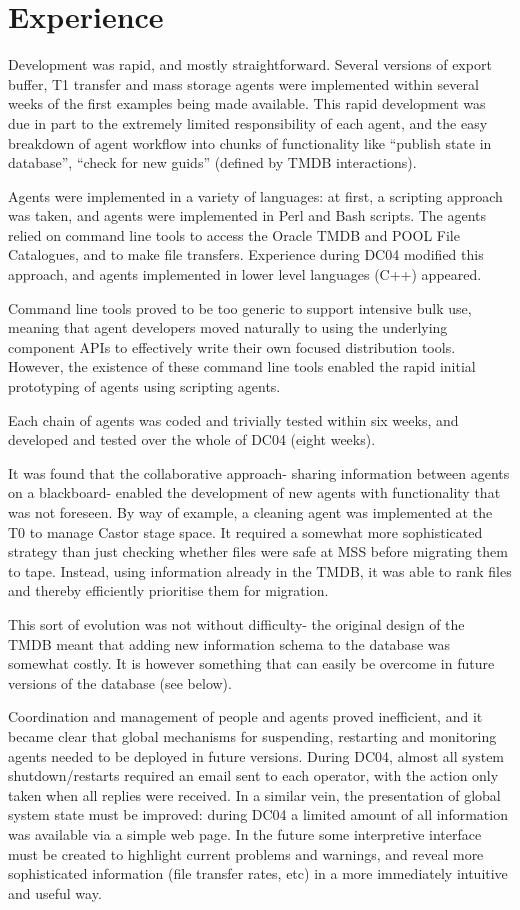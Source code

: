\documentclass{cmspaper}
\begin{document}
\section{Experience}
Development was rapid, and mostly straightforward. Several versions of
export buffer, T1 transfer and mass storage agents were implemented
within several weeks of the first examples being made available. This
rapid development was due in part to the extremely limited
responsibility of each agent, and the easy breakdown of agent workflow
into chunks of functionality like ``publish state in database'',
``check for new guids'' (defined by TMDB interactions).

Agents were implemented in a variety of languages: at first, a
scripting approach was taken, and agents were implemented in Perl and
Bash scripts. The agents relied on command line tools to access the
Oracle TMDB and POOL File Catalogues, and to make file
transfers. Experience during DC04 modified this approach, and agents
implemented in lower level languages (C++) appeared.

Command line tools proved to be too generic to support intensive bulk
use, meaning that agent developers moved naturally to using the
underlying component APIs to effectively write their own focused
distribution tools. However, the existence of these command line tools
enabled the rapid initial prototyping of agents using scripting
agents.

Each chain of agents was coded and trivially tested within six weeks,
and developed and tested over the whole of DC04 (eight weeks).

It was found that the collaborative approach- sharing information
between agents on a blackboard- enabled the development of new agents
with functionality that was not foreseen. By way of example, a
cleaning agent was implemented at the T0 to manage Castor stage
space. It required a somewhat more sophisticated strategy than just
checking whether files were safe at MSS before migrating them to
tape. Instead, using information already in the TMDB, it was able to
rank files and thereby efficiently prioritise them for migration.

This sort of evolution was not without difficulty- the original design
of the TMDB meant that adding new information schema to the database
was somewhat costly. It is however something that can easily be
overcome in future versions of the database (see below).

Coordination and management of people and agents proved inefficient,
and it became clear that global mechanisms for suspending, restarting
and monitoring agents needed to be deployed in future versions. During
DC04, almost all system shutdown/restarts required an email sent to
each operator, with the action only taken when all replies were
received. In a similar vein, the presentation of global system state
must be improved: during DC04 a limited amount of all information was
available via a simple web page. In the future some interpretive
interface must be created to highlight current problems and warnings,
and reveal more sophisticated information (file transfer rates, etc)
in a more immediately intuitive and useful way.
\end{document}
